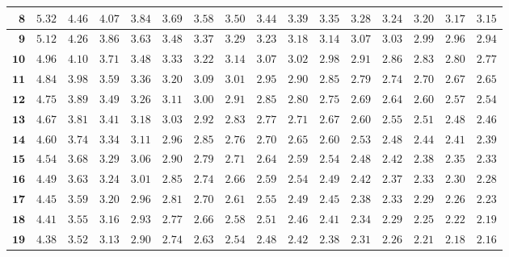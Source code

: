 \begin{alternateColorTable}
\begin{longtable}{|r|r|r|r|r|r|r|r|r|r|r|r|r|r|r|r|}
    \(\mathbf{8}\) & \(5.32\) & \(4.46\) & \(4.07\) & \(3.84\) & \(3.69\) & \(3.58\) & \(3.50\) & \(3.44\) & \(3.39\) & \(3.35\) & \(3.28\) & \(3.24\) & \(3.20\) & \(3.17\) & \(3.15\) \\ \hline
    \(\mathbf{9}\) & \(5.12\) & \(4.26\) & \(3.86\) & \(3.63\) & \(3.48\) & \(3.37\) & \(3.29\) & \(3.23\) & \(3.18\) & \(3.14\) & \(3.07\) & \(3.03\) & \(2.99\) & \(2.96\) & \(2.94\) \\ \hline
    \(\mathbf{10}\) & \(4.96\) & \(4.10\) & \(3.71\) & \(3.48\) & \(3.33\) & \(3.22\) & \(3.14\) & \(3.07\) & \(3.02\) & \(2.98\) & \(2.91\) & \(2.86\) & \(2.83\) & \(2.80\) & \(2.77\) \\ \hline
    \(\mathbf{11}\) & \(4.84\) & \(3.98\) & \(3.59\) & \(3.36\) & \(3.20\) & \(3.09\) & \(3.01\) & \(2.95\) & \(2.90\) & \(2.85\) & \(2.79\) & \(2.74\) & \(2.70\) & \(2.67\) & \(2.65\) \\ \hline
    \(\mathbf{12}\) & \(4.75\) & \(3.89\) & \(3.49\) & \(3.26\) & \(3.11\) & \(3.00\) & \(2.91\) & \(2.85\) & \(2.80\) & \(2.75\) & \(2.69\) & \(2.64\) & \(2.60\) & \(2.57\) & \(2.54\) \\ \hline
    \(\mathbf{13}\) & \(4.67\) & \(3.81\) & \(3.41\) & \(3.18\) & \(3.03\) & \(2.92\) & \(2.83\) & \(2.77\) & \(2.71\) & \(2.67\) & \(2.60\) & \(2.55\) & \(2.51\) & \(2.48\) & \(2.46\) \\ \hline
    \(\mathbf{14}\) & \(4.60\) & \(3.74\) & \(3.34\) & \(3.11\) & \(2.96\) & \(2.85\) & \(2.76\) & \(2.70\) & \(2.65\) & \(2.60\) & \(2.53\) & \(2.48\) & \(2.44\) & \(2.41\) & \(2.39\) \\ \hline
    \(\mathbf{15}\) & \(4.54\) & \(3.68\) & \(3.29\) & \(3.06\) & \(2.90\) & \(2.79\) & \(2.71\) & \(2.64\) & \(2.59\) & \(2.54\) & \(2.48\) & \(2.42\) & \(2.38\) & \(2.35\) & \(2.33\) \\ \hline
    \(\mathbf{16}\) & \(4.49\) & \(3.63\) & \(3.24\) & \(3.01\) & \(2.85\) & \(2.74\) & \(2.66\) & \(2.59\) & \(2.54\) & \(2.49\) & \(2.42\) & \(2.37\) & \(2.33\) & \(2.30\) & \(2.28\) \\ \hline
    \(\mathbf{17}\) & \(4.45\) & \(3.59\) & \(3.20\) & \(2.96\) & \(2.81\) & \(2.70\) & \(2.61\) & \(2.55\) & \(2.49\) & \(2.45\) & \(2.38\) & \(2.33\) & \(2.29\) & \(2.26\) & \(2.23\) \\ \hline
    \(\mathbf{18}\) & \(4.41\) & \(3.55\) & \(3.16\) & \(2.93\) & \(2.77\) & \(2.66\) & \(2.58\) & \(2.51\) & \(2.46\) & \(2.41\) & \(2.34\) & \(2.29\) & \(2.25\) & \(2.22\) & \(2.19\) \\ \hline
    \(\mathbf{19}\) & \(4.38\) & \(3.52\) & \(3.13\) & \(2.90\) & \(2.74\) & \(2.63\) & \(2.54\) & \(2.48\) & \(2.42\) & \(2.38\) & \(2.31\) & \(2.26\) & \(2.21\) & \(2.18\) & \(2.16\) \\ \hline

\end{longtable}
\end{alternateColorTable}
